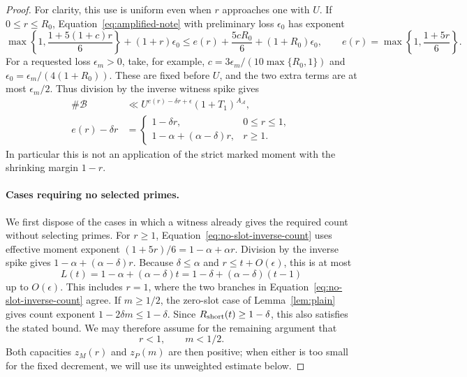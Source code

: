\documentclass[11pt,a4paper]{article}
\numberwithin{equation}{section}
\numberwithin{figure}{section}
\theoremstyle{definition}
\theoremstyle{remark}
\begin{document}
\begin{proof}
For clarity, this use is uniform even when \(r\) approaches one
with \(U\).  If \(0\le r\le R_0\), Equation~\eqref{eq:amplified-note}
with preliminary loss \(\epsilon_0\) has exponent
\[
 \max\left\{1,\frac{1+5(1+c)r}{6}\right\}
       +(1+r)\epsilon_0
 \le e(r)+\frac{5cR_0}{6}+(1+R_0)\epsilon_0,
 \qquad e(r)=\max\left\{1,\frac{1+5r}{6}\right\}.
\]
For a requested loss \(\epsilon_m>0\), take, for example,
\(c=3\epsilon_m/(10\max\{R_0,1\})\) and
\(\epsilon_0=\epsilon_m/(4(1+R_0))\).  These are fixed before
\(U\), and the two extra terms are at most \(\epsilon_m/2\).
Thus division by the inverse witness spike gives
\begin{equation}\label{eq:no-slot-inverse-count}
 \begin{aligned}
 \#\mathcal B&\ll
 U^{e(r)-\delta r+\epsilon}(1+T_1)^{A_{\mathcal A}},\\
 e(r)-\delta r&=
 \begin{cases}
  1-\delta r,&0\le r\le1,\\
  1-\alpha+(\alpha-\delta)r,&r\ge1.
 \end{cases}
 \end{aligned}
\end{equation}
In particular this is not an application of the strict marked
moment with the shrinking margin \(1-r\).

\paragraph{Cases requiring no selected primes.}
We first dispose of the cases in which a witness already gives the
required count without selecting primes.
For \(r\ge1\), Equation~\eqref{eq:no-slot-inverse-count} uses effective
moment exponent \((1+5r)/6=1-\alpha+\alpha r\).
Division by the inverse spike gives
\(1-\alpha+(\alpha-\delta)r\).
Because \(\delta\le\alpha\) and \(r\le t+O(\epsilon)\), this is at
most
\begin{equation}
 L(t)=1-\alpha+(\alpha-\delta)t
     =1-\delta+(\alpha-\delta)(t-1)
 \label{eq:long-count}
\end{equation}
up to \(O(\epsilon)\).  This includes \(r=1\), where the two
branches in Equation~\eqref{eq:no-slot-inverse-count} agree.
If \(m\ge1/2\), the zero-slot case of Lemma~\ref{lem:plain}
gives count exponent \(1-2\delta m\le1-\delta\).
Since \(R_{\rm short}(t)\ge1-\delta\), this also satisfies the
stated bound.  We may therefore assume for the remaining argument that
\[
 r<1,\qquad m<1/2.
\]
Both capacities \(z_M(r)\) and \(z_P(m)\) are then positive;
when either is too small for the fixed decrement, we will use its
unweighted estimate below.


\end{proof}
\end{document}
